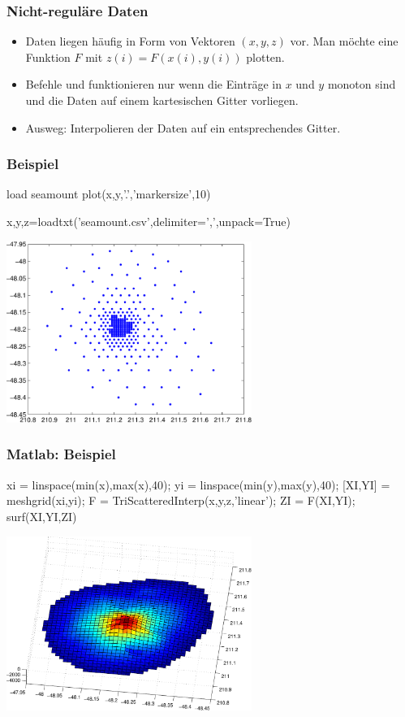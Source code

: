 \documentclass[hyperref={xetex}]{beamer}
\begin{document}
%
% 
\begin{frame}[fragile]\frametitle{Nicht-reguläre Daten}
\begin{itemize}
\item Daten liegen h\"aufig in Form von Vektoren $(x,y,z)$ vor. Man m\"ochte
  eine Funktion $F$ mit $z(i) = F(x(i),y(i))$ plotten.
\item Befehle  und  funktionieren nur wenn  die
  Einträge in $x$ und $y$ monoton sind und die Daten auf einem kartesischen
  Gitter vorliegen.
\item Ausweg: Interpolieren der Daten auf ein entsprechendes Gitter. 
\end{itemize}
\end{frame}
%
% 
\begin{frame}[fragile]\frametitle{Beispiel}
\begin{matlabin}
load seamount
plot(x,y,'.','markersize',10)
\end{matlabin}
\begin{pyin}
x,y,z=loadtxt('seamount.csv',delimiter=',',unpack=True)  
\end{pyin}
\begin{center}
\includegraphics[width=0.6\textwidth]{figures/beispiel_scattered_data}
\end{center}
\end{frame}
%
% 
\begin{frame}[fragile]\frametitle{Matlab: Beispiel}
\begin{matlabin}
xi = linspace(min(x),max(x),40);
yi = linspace(min(y),max(y),40);
[XI,YI] = meshgrid(xi,yi);
F = TriScatteredInterp(x,y,z,'linear');
ZI = F(XI,YI);
surf(XI,YI,ZI)
\end{matlabin}
\begin{center}
\includegraphics[width=0.6\textwidth]{figures/beispiel_scattered_data_plot}
\end{center}
\end{frame}
\end{document}
